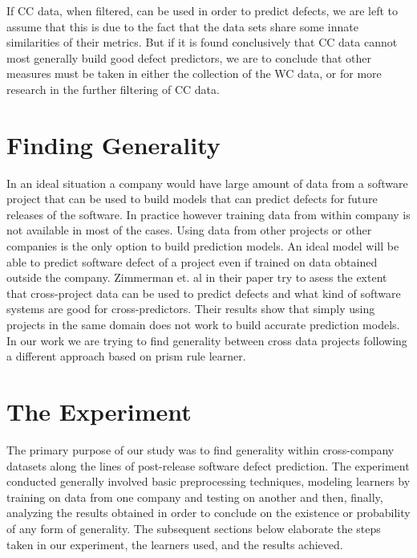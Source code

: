\documentclass{sig-alternate}
\begin{document}
If CC data, when filtered, can be used in order to predict defects, we are left to assume that this is due to the fact that the data sets share some innate similarities of their metrics. But if it is found conclusively that CC data cannot most generally build good defect predictors, we are to conclude that other measures must be taken in either the collection of the WC data, or for more research in the further filtering of CC data.


\section{Finding Generality}
In an ideal situation a company would have large amount of data from a software project that can be used to build models that can predict defects for
future releases of the software. In practice however training data from within company is not available in most of the cases. Using data from other projects or other companies is the only option to build prediction models. An ideal model will be able to predict software defect of a project even if trained on data obtained outside the company. Zimmerman et. al in their paper
try to asess the extent that cross-project data can be used to predict defects and what kind of software systems are good for cross-predictors. Their results
show that simply using projects in the same domain does not work to build accurate prediction models. In our work we are trying to find generality
between cross data projects following a different approach based on prism rule learner.

\section{The Experiment}
The primary purpose of our study was to find generality within cross-company datasets along the lines of post-release software defect prediction. The experiment conducted generally involved basic preprocessing techniques, modeling learners by training on data from one company and testing on another and then, finally,  analyzing the results obtained in order to conclude on the existence or probability of any form of generality. The subsequent sections below elaborate the steps taken in our experiment, the learners used, and the results achieved.
\end{document}
